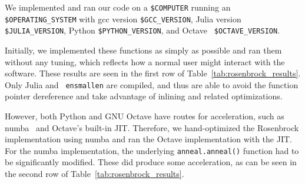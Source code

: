\documentclass{article}
\begin{document}
We implemented and ran our code on a {\tt \$COMPUTER} running an {\tt
\$OPERATING\_SYSTEM} with gcc version {\tt \$GCC\_VERSION}, Julia version {\tt
\$JULIA\_VERSION}, Python {\tt \$PYTHON\_VERSION}, and Octave {\tt
\$OCTAVE\_VERSION}.

Initially, we implemented these functions as simply as possible and ran them
without any tuning, which reflects how a normal user might interact with the
software.  These results are seen in the first row of
Table~\ref{tab:rosenbrock_results}.  Only Julia and {\tt
ensmallen} are compiled, and thus are able to avoid the function pointer
dereference and take advantage of inlining and related optimizations.



However, both Python and GNU Octave have routes for acceleration, such as
numba~\cite{TODO} and Octave's built-in JIT.  Therefore, we hand-optimized the
Rosenbrock implementation using numba and ran the Octave implementation with the
JIT.  For the numba implementation, the underlying {\tt anneal.anneal()}
function had to be significantly modified.  These did produce some acceleration,
as can be seen in the second row of Table~\ref{tab:rosenbrock_results}.
\end{document}
